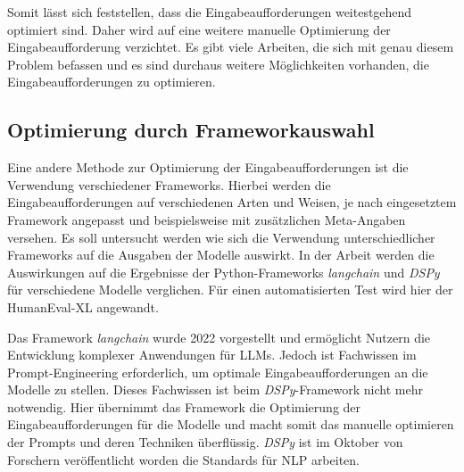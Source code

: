 Somit lässt sich feststellen, dass die Eingabeaufforderungen weitestgehend optimiert sind. Daher wird auf eine weitere manuelle Optimierung der Eingabeaufforderung verzichtet. Es gibt viele Arbeiten, die sich mit genau diesem Problem befassen und es sind durchaus weitere Möglichkeiten vorhanden, die Eingabeaufforderungen zu optimieren.\vspace{0.2cm}


\subsection{Optimierung durch Frameworkauswahl}
Eine andere Methode zur Optimierung der Eingabeaufforderungen ist die Verwendung verschiedener Frameworks. Hierbei werden die Eingabeaufforderungen auf verschiedenen Arten und Weisen, je nach eingesetztem Framework angepasst und beispielsweise mit zusätzlichen Meta-Angaben versehen. Es soll untersucht werden wie sich die Verwendung unterschiedlicher Frameworks auf die Ausgaben der Modelle auswirkt. In der Arbeit werden die Auswirkungen auf die Ergebnisse der Python-Frameworks \textit{langchain} und \textit{DSPy} für verschiedene Modelle verglichen. Für einen automatisierten Test wird hier der HumanEval-XL angewandt.\vspace{0.2cm}

Das Framework \textit{langchain} wurde 2022 vorgestellt und ermöglicht Nutzern die Entwicklung komplexer Anwendungen für LLMs. Jedoch ist Fachwissen im Prompt-Engineering erforderlich, um optimale Eingabeaufforderungen an die Modelle zu stellen. Dieses Fachwissen ist beim \textit{DSPy}-Framework nicht mehr notwendig. Hier übernimmt das Framework die Optimierung der Eingabeaufforderungen für die Modelle und macht somit das manuelle optimieren der Prompts und deren Techniken überflüssig. \textit{DSPy} ist im Oktober von Forschern veröffentlicht worden die Standards für NLP arbeiten.\vspace{0.2cm}


